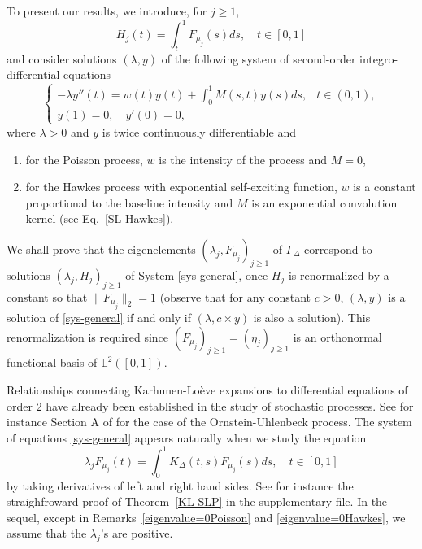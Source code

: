 \documentclass[aos]{imsart}
\theoremstyle{plain}
\theoremstyle{remark}
\newcommand{\1}{1}
\begin{document}
\indent To present our results, we introduce, for $j\geq 1$, 
\begin{equation}\label{Hj}
H_j(t)=\int_t^1F_{\mu_j}(s)ds, \quad t\in [0,1]
\end{equation}
and consider solutions $(\lambda,y)$  of the following system of second-order integro-differential equations
\begin{equation}\label{sys-general}
\left\{
\begin{array}{ll}
\displaystyle -\lambda y''(t)=w(t)y(t)+\int_0^1 M(s,t)y(s)ds ,   &t\in(0,1),\\
y(1)  =0,\quad y'(0)=0,&
\end{array}
\right.
\end{equation}
where $\lambda>0$ and $y$ is twice continuously differentiable and 
\begin{enumerate}
\item for the Poisson process, $w$ is the intensity of the process and $M=0$,
\item for the Hawkes process with exponential self-exciting function, $w$ is a constant proportional to the baseline intensity and $M$ is an exponential convolution kernel (see Eq.~\eqref{SL-Hawkes}).
\end{enumerate}
We shall prove that the eigenelements $(\lambda_j,F_{\mu_j})_{j\geq 1}$ of $\Gamma_\Delta$ correspond to solutions $(\lambda_j,H_j)_{j\geq 1}$ of System \eqref{sys-general}, once $H_j$ is renormalized by a constant so that $\|F_{\mu_j}\|_2=1$ (observe that for any constant $c>0$, $(\lambda,y)$ is a solution of \eqref{sys-general} if and only if $(\lambda,c\times y)$ is also a solution). This renormalization is required since $(F_{\mu_j})_{j\geq 1}=(\eta_j)_{j\geq 1}$ is an orthonormal functional basis  of $\mathbb L^2([0,1])$.


Relationships connecting Karhunen-Lo\`eve expansions to differential equations of order 2 have already been established in the study of stochastic processes. See for instance Section A of \cite{CP15} for the case of the Ornstein-Uhlenbeck process. The system of equations \eqref{sys-general} appears naturally when we study the equation
\[
\lambda_j F_{\mu_j}(t)=\int_0^1K_\Delta(t,s)F_{\mu_j}(s)ds,\quad t\in[0,1]
\]
by taking derivatives of left and right hand sides. See for instance the straighfroward proof of Theorem~\ref{KL-SLP} in the supplementary file. In the sequel, except in Remarks~\ref{eigenvalue=0Poisson} and \ref{eigenvalue=0Hawkes}, we assume that the $\lambda_j$'s are positive.

\end{document}
